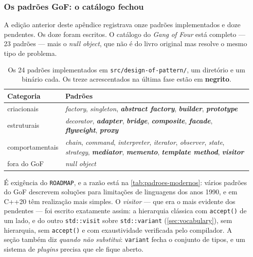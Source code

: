 \subsubsection{Os padrões GoF: o catálogo fechou}

A edição anterior deste apêndice registrava onze padrões implementados e doze
pendentes. Os doze foram escritos. O catálogo do \emph{Gang of Four} está
completo --- 23 padrões --- mais o \emph{null object}, que não é do livro
original mas resolve o mesmo tipo de problema.

\begin{table}[htbp]
\centering
\caption{Os 24 padrões implementados em \texttt{src/design-of-pattern/}, um
         diretório e um binário cada. Os treze acrescentados na última fase
         estão em \textbf{negrito}.}
\label{tab:gof-pendentes}
\footnotesize
\begin{tabular}{@{}lp{}@{}}
\toprule
\textbf{Categoria} & \textbf{Padrões} \\
\midrule
criacionais     & \emph{factory}, \emph{singleton}, \textbf{\emph{abstract factory}},
                  \textbf{\emph{builder}}, \textbf{\emph{prototype}} \\
estruturais     & \emph{decorator}, \textbf{\emph{adapter}}, \textbf{\emph{bridge}},
                  \textbf{\emph{composite}}, \textbf{\emph{facade}},
                  \textbf{\emph{flyweight}}, \textbf{\emph{proxy}} \\
comportamentais & \emph{chain}, \emph{command}, \emph{interpreter}, \emph{iterator},
                  \emph{observer}, \emph{state}, \emph{strategy},
                  \textbf{\emph{mediator}}, \textbf{\emph{memento}},
                  \textbf{\emph{template method}}, \textbf{\emph{visitor}} \\
fora do GoF     & \emph{null object} \\
\bottomrule
\end{tabular}
\end{table}

\begin{regra}
É exigência do \texttt{ROADMAP}, e a razão está na
\cref{tab:padroes-modernos}: vários padrões do GoF descrevem soluções para
limitações de linguagens dos anos 1990, e em C++20 têm realização mais simples.
O \emph{visitor} --- que era o mais evidente dos pendentes --- foi escrito
exatamente assim: a hierarquia clássica com \texttt{accept()} de um lado, e do
outro \texttt{std::visit} sobre \texttt{std::variant}
(\cref{sec:vocabulary}), sem hierarquia, sem \texttt{accept()} e com
exaustividade verificada pelo compilador. A seção também diz \emph{quando não
substitui}: \texttt{variant} fecha o conjunto de tipos, e um sistema de
\emph{plugins} precisa que ele fique aberto.
\end{regra}

